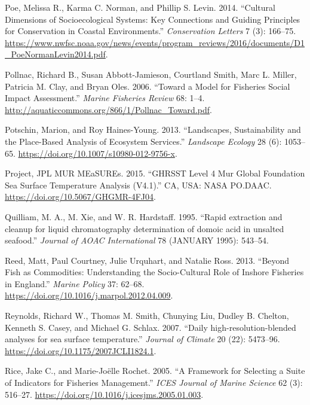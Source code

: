 \documentclass[
]{book}
\newlength{\cslhangindent}
\newenvironment{cslreferences}%
  {\setlength{\parindent}{0pt}%
  \everypar{\setlength{\hangindent}{\cslhangindent}}\ignorespaces}%
  {\par}
\begin{document}
\begin{cslreferences}
\leavevmode\hypertarget{ref-poe_cultural_2014}{}%
Poe, Melissa R., Karma C. Norman, and Phillip S. Levin. 2014. ``Cultural Dimensions of Socioecological Systems: Key Connections and Guiding Principles for Conservation in Coastal Environments.'' \emph{Conservation Letters} 7 (3): 166--75. \url{https://www.nwfsc.noaa.gov/news/events/program_reviews/2016/documents/D1_PoeNormanLevin2014.pdf}.

\leavevmode\hypertarget{ref-pollnac_toward_2006}{}%
Pollnac, Richard B., Susan Abbott-Jamieson, Courtland Smith, Marc L. Miller, Patricia M. Clay, and Bryan Oles. 2006. ``Toward a Model for Fisheries Social Impact Assessment.'' \emph{Marine Fisheries Review} 68: 1--4. \url{http://aquaticcommons.org/866/1/Pollnac_Toward.pdf}.

\leavevmode\hypertarget{ref-potschin_landscapes_2013}{}%
Potschin, Marion, and Roy Haines-Young. 2013. ``Landscapes, Sustainability and the Place-Based Analysis of Ecosystem Services.'' \emph{Landscape Ecology} 28 (6): 1053--65. \url{https://doi.org/10.1007/s10980-012-9756-x}.

\leavevmode\hypertarget{ref-SOE14}{}%
Project, JPL MUR MEaSUREs. 2015. ``GHRSST Level 4 Mur Global Foundation Sea Surface Temperature Analysis (V4.1).'' CA, USA: NASA PO.DAAC. \url{https://doi.org/10.5067/GHGMR-4FJ04}.

\leavevmode\hypertarget{ref-Quilliam1995}{}%
Quilliam, M. A., M. Xie, and W. R. Hardstaff. 1995. ``Rapid extraction and cleanup for liquid chromatography determination of domoic acid in unsalted seafood.'' \emph{Journal of AOAC International} 78 (JANUARY 1995): 543--54.

\leavevmode\hypertarget{ref-reed_beyond_2013}{}%
Reed, Matt, Paul Courtney, Julie Urquhart, and Natalie Ross. 2013. ``Beyond Fish as Commodities: Understanding the Socio-Cultural Role of Inshore Fisheries in England.'' \emph{Marine Policy} 37: 62--68. \url{https://doi.org/10.1016/j.marpol.2012.04.009}.

\leavevmode\hypertarget{ref-Reynolds2007}{}%
Reynolds, Richard W., Thomas M. Smith, Chunying Liu, Dudley B. Chelton, Kenneth S. Casey, and Michael G. Schlax. 2007. ``Daily high-resolution-blended analyses for sea surface temperature.'' \emph{Journal of Climate} 20 (22): 5473--96. \url{https://doi.org/10.1175/2007JCLI1824.1}.

\leavevmode\hypertarget{ref-rice_framework_2005}{}%
Rice, Jake C., and Marie-Joëlle Rochet. 2005. ``A Framework for Selecting a Suite of Indicators for Fisheries Management.'' \emph{ICES Journal of Marine Science} 62 (3): 516--27. \url{https://doi.org/10.1016/j.icesjms.2005.01.003}.


\end{cslreferences}
\end{document}
